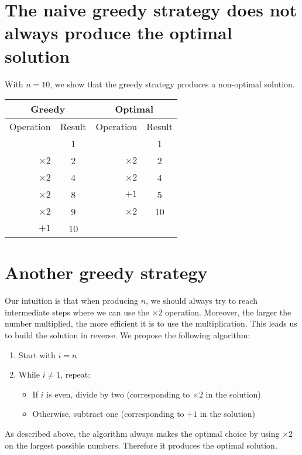 
\section{The naive greedy strategy does not always produce the optimal solution}

With $n = 10$, we show that the greedy strategy produces a non-optimal solution.

\begin{center}
  \begin{tabular}{|r|cr|c|}
    \hline
    \multicolumn{2}{|c|}{Greedy} & \multicolumn{2}{|c|}{Optimal} \\
    \hline
    Operation & Result & Operation & Result \\
    \hline
               &  1 &            &  1 \\
    $\times 2$ &  2 & $\times 2$ &  2 \\
    $\times 2$ &  4 & $\times 2$ &  4 \\
    $\times 2$ &  8 & $+1$       &  5 \\
    $\times 2$ &  9 & $\times 2$ & 10 \\
    $+1$       & 10 & \multicolumn{2}{c|}{} \\
    \hline
  \end{tabular}
\end{center}

\section{Another greedy strategy}

Our intuition is that when producing $n$, we should always try to reach intermediate steps where we can use the $\times 2$ operation. Moreover, the larger the number multiplied, the more efficient it is to use the multiplication. This leads us to build the solution in reverse. We propose the following algorithm:

\begin{enumerate}
  \item Start with $i = n$
  \item While $i \neq 1$, repeat:
  \begin{itemize}
    \item If $i$ is even, divide by two (corresponding to $\times 2$ in the solution)
    \item Otherwise, subtract one (corresponding to $+1$ in the solution)
  \end{itemize}
\end{enumerate}

As described above, the algorithm always makes the optimal choice by using $\times 2$ on the largest possible numbers. Therefore it produces the optimal solution.
